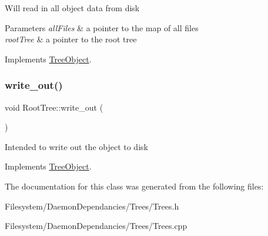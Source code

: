 Will read in all object data from disk 
\begin{DoxyParams}{Parameters}
{\em all\+Files} & a pointer to the map of all files \\
\hline
{\em root\+Tree} & a pointer to the root tree \\
\hline
\end{DoxyParams}


Implements \mbox{\hyperlink{classTreeObject_a722eb00e6782626281afc8eff92840a4}{Tree\+Object}}.

\mbox{\label{classRootTree_ad6eefe5d46ee37b3725799897a78c2dd}} 
\subsubsection{\texorpdfstring{write\+\_\+out()}{write\_out()}}
{\footnotesize\ttfamily void Root\+Tree\+::write\+\_\+out (\begin{DoxyParamCaption}{ }\end{DoxyParamCaption})\hspace{0.3cm}{\ttfamily [virtual]}}

Intended to write out the object to disk 

Implements \mbox{\hyperlink{classTreeObject_a63708d61353d83e3e03597394bb7aca0}{Tree\+Object}}.



The documentation for this class was generated from the following files\+:\begin{DoxyCompactItemize}
\item 
Filesystem/\+Daemon\+Dependancies/\+Trees/Trees.\+h\item 
Filesystem/\+Daemon\+Dependancies/\+Trees/Trees.\+cpp\end{DoxyCompactItemize}
